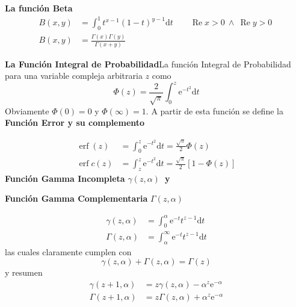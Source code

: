 \documentclass[spanish,notitlepage,letterpaper,12pt]{article}
\begin{document}
\begin{center}
\textbf{La funci\'{o}n Beta}
\begin{align*}
B(x,y)  & =\int_{0}^{1}t^{x-1}\left(  1-t\right)  ^{y-1}\mathrm{d}%
t\qquad\operatorname{Re}x>0\ \wedge\ \operatorname{Re}y>0\ \\
B(x,y)  & =\frac{\Gamma\left(  x\right)  \Gamma\left(  y\right)  }%
{\Gamma\left(  x+y\right)  }%
\end{align*}
\end{center}

\textbf{La Funci\'{o}n Integral de Probabilidad}\newline La funci\'{o}n
Integral de Probabilidad para una variable compleja arbitraria $z$ como
\[
\Phi(z)=\frac2{\sqrt{\pi}}\int_{0}^{z}\mathrm{e}^{-t^{2}}\mathrm{d}t
\]
Obviamente $\Phi(0)=0$ y $\Phi(\infty)=1.$ A partir de esta funci\'{o}n se
define la \textbf{Funci\'{o}n Error y su complemento}

\begin{center}%
\begin{align*}
\operatorname{erf}(z)  & =\int_{0}^{z}\mathrm{e}^{-t^{2}}\mathrm{d}%
t=\frac{\sqrt{\pi}}2\Phi(z)\\
\operatorname{erf}c(z)  & =\int_{z}^{z}\mathrm{e}^{-t^{2}}\mathrm{d}%
t=\frac{\sqrt{\pi}}2\left[  1-\Phi(z)\right]
\end{align*}
\textbf{Funci\'{o}n Gamma Incompleta }$\gamma\left(  z,\alpha\right)
$\textbf{\ y }

\textbf{Funci\'{o}n Gamma Complementaria }$\Gamma\left(  z,\alpha\right)  $
\end{center}%

\begin{align*}
\gamma\left(  z,\alpha\right)    & =\int_{0}^{\alpha}\mathrm{e}^{-t}%
t^{z-1}\mathrm{d}t\\
\Gamma\left(  z,\alpha\right)    & =\int_{\alpha}^{\infty}\mathrm{e}%
^{-t}t^{z-1}\mathrm{d}t
\end{align*}
las cuales claramente cumplen con
\[
\gamma\left(  z,\alpha\right)  +\Gamma\left(  z,\alpha\right)  =\Gamma\left(
z\right)
\]
y resumen
\begin{align*}
\gamma\left(  z+1,\alpha\right)    & =z\gamma\left(  z,\alpha\right)
-\alpha^{z}\mathrm{e}^{-\alpha}\\
\Gamma\left(  z+1,\alpha\right)    & =z\Gamma\left(  z,\alpha\right)
+\alpha^{z}\mathrm{e}^{-\alpha}%
\end{align*}

\newpage
\end{document}
